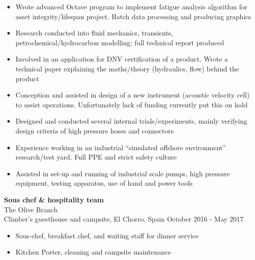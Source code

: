 \documentclass[margin, line, 10pt]{res} %
\begin{document}
\begin{resume}
\begin{itemize}
\item Wrote advanced Octave program to implement fatigue analysis algorithm for asset integrity/lifespan project. Batch data processing and producing graphics

\item Research conducted into fluid mechanics, transients, petrochemical/hydrocarbon modelling; full technical report produced

\item Involved in an application for DNV certification of a product. Wrote a technical paper explaining the maths/theory (hydraulics, flow) behind the product

\item Conception and assisted in design of a new instrument (acoustic velocity cell) to assist operations. Unfortunately lack of funding currently put this on hold

\item Designed and conducted several internal trials/experiments, mainly verifying design criteria of high pressure hoses and connectors 

\item Experience working in an industrial ``simulated offshore environment'' research/test yard. Full PPE and strict safety culture 

\item Assisted in set-up and running of industrial scale pumps, high pressure equipment, testing apparatus, use of hand and power tools

\end{itemize}

\textbf{Sous chef \& hospitality team} \\
The Olive Branch\\
Climber's guesthouse and campsite, El Chorro, Spain \hfill October 2016 - May 2017\\
\begin{itemize} \itemsep -2pt %
\item Sous-chef, breakfast chef, and waiting staff for dinner service 
\item Kitchen Porter, cleaning and campsite maintenance
\end{itemize}


\end{resume}
\end{document}
